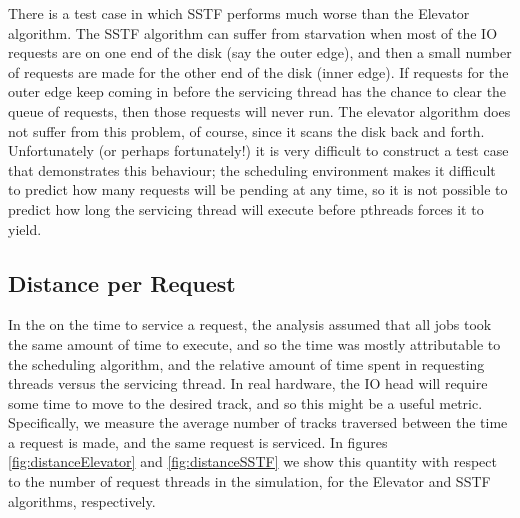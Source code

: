 \documentclass{report}
\begin{document}
%
There is a test case in which SSTF performs much worse than the Elevator algorithm. The
SSTF algorithm can suffer from starvation when most of the IO requests are on one end of
the disk (say the outer edge), and then a small number of requests are made for the other
end of the disk (inner edge). If
requests for the outer edge keep coming in before the servicing thread has the chance to
clear the queue of requests, then those requests will never run. The elevator algorithm
does not suffer from this problem, of course, since it scans the disk back and forth.
Unfortunately (or perhaps fortunately!) it is very difficult to construct a test case that demonstrates this
behaviour; the scheduling environment makes it difficult to predict how many
requests will be pending at any time, so it is not possible to predict how long the servicing
thread will execute before pthreads forces it to yield.

\subsection{Distance per Request}
In the on the time to service a request, the analysis assumed that all jobs took the same
amount of time to execute, and so the time was mostly attributable to the scheduling
algorithm, and the relative amount of time spent in requesting threads versus the
servicing thread. In real hardware, the IO head will require some time to move to the
desired track, and so this might be a useful metric. Specifically, we measure the average
number of tracks traversed between the time a request is made, and the same request is
serviced. In figures \ref{fig:distanceElevator} and \ref{fig:distanceSSTF} we show this 
quantity with respect to the number of request threads in the simulation, for the
Elevator and SSTF algorithms, respectively.
\end{document}
